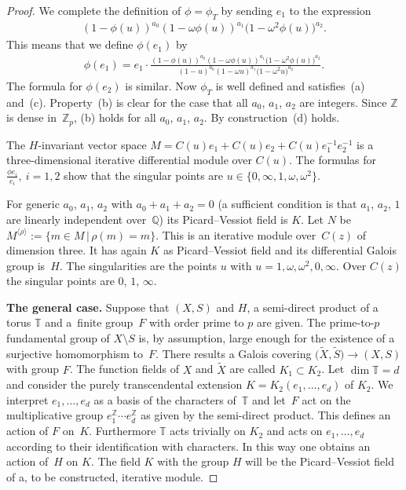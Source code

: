 \documentclass[10pt,a4paper]{amsart}
\numberwithin{equation}{section}
\begin{document}
\begin{proof}
We complete the definition of $\phi=\phi_T$ by sending $e_1$ to the expression
\begin{gather*}
(1-\phi(u))^{a_0}(1-\omega \phi(u))^{a_1}\big(1-\omega^2\phi(u)\big)^{a_2}.
\end{gather*} This means that we define $\phi (e_1)$ by
 \begin{gather*} \phi (e_1)=e_1\cdot \frac{(1-\phi(u))^{a_0}(1-\omega \phi(u))^{a_1}\big(1-\omega^2\phi(u)\big)^{a_2}}{(1-u)^{a_0}(1-\omega
 u)^{a_1}\big(1-\omega^2u\big)^{a_2}}.\end{gather*}
The formula for $\phi(e_2)$ is similar. Now $\phi_T$ is well defined and satisfies~(a) and~(c). Property~(b) is clear for the case that all $a_0$, $a_1$, $a_2$ are integers. Since $\mathbb{Z}$ is dense in~$\mathbb{Z}_p$, (b) holds for all $a_0$, $a_1$, $a_2$. By construction~(d) holds.

The $H$-invariant vector space $M=C(u)e_1+C(u)e_2+C(u)e_1^{-1}e_2^{-1}$ is a three-dimensional iterative differential module over $C(u)$. The formulas for $\frac{\phi e_i}{e_i},\ i=1,2$ show that the singular points are $u\in \big\{0,\infty, 1,\omega, \omega^2\big\}$.

For generic $a_0$, $a_1$, $a_2$ with $a_0+a_1+a_2=0$ (a sufficient condition is that $a_1$, $a_2$, $1$ are linearly independent over~$\mathbb{Q}$) its Picard--Vessiot field is
$K$. Let $N$ be $M^{\langle \rho \rangle}:=\{m\in M\, | \, \rho(m)=m\}$. This is an iterative module over~$C(z)$ of dimension three. It has again $K$ as Picard--Vessiot field and its differential Galois group is~$H$. The singularities are the points $u$ with $u=1,\omega, \omega^2, 0, \infty$. Over $C(z)$ the singular points are $0$, $1$, $\infty$.

{\bf The general case.} Suppose that $(X,S)$ and $H$, a semi-direct product of a torus $\mathbb{T}$ and a~finite group~$F$ with order prime to $p$ are given. The prime-to-$p$ fundamental group of $X\setminus S$ is, by assumption, large enough for the existence of a surjective homomorphism to~$F$. There results a Galois covering $\big(\tilde{X},\tilde{S}\big)\rightarrow (X,S)$ with group $F$. The function fields of $X$ and $\tilde{X}$ are called \mbox{$K_1\subset K_2$}. Let $\dim \mathbb{T}=d$ and consider the purely transcendental extension $K=K_2(e_1,\dots ,e_d)$ of $K_2$. We interpret $e_1,\dots ,e_d$ as a basis of the characters of~$\mathbb{T}$ and let~$F$ act on the multiplicative group $e_1^\mathbb{Z} \cdots e_d^\mathbb{Z}$ as given by the semi-direct product. This defines an action of $F$ on~$K$. Furthermore $\mathbb{T}$ acts trivially on $K_2$ and acts on $e_1,\dots, e_d$ according to their identification with characters. In this way one obtains an action of~$H$ on $K$. The field $K$ with the group $H$ will be the Picard--Vessiot field of a, to be constructed, iterative module.


\end{proof}
\end{document}
